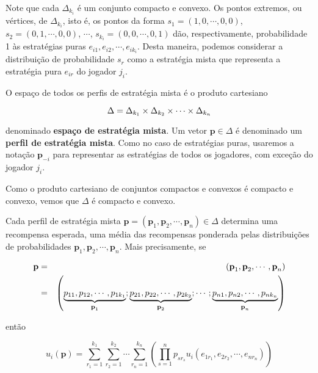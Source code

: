 Note que cada $\Delta_{k_i}$ é um conjunto compacto e convexo. Os pontos extremos, ou vértices, de $\Delta_{k_i}$, isto é, os pontos da forma $s_1=(1,0,\cdots,0,0)$, $s_2=(0,1,\cdots,0,0)$, $\cdots$, $s_{k_i}=(0,0,\cdots,0,1)$ dão, respectivamente, probabilidade 1 às estratégias puras $e_{i1}, e_{i2},\cdots , e_{ik_i}$. Desta maneira, podemos considerar a distribuição de probabilidade $s_r$ como a estratégia mista que representa a estratégia pura $e_{ir}$ do jogador $j_i$.

O espaço de todos os perfis de estratégia mista é o produto cartesiano

$$\Delta=\Delta_{k_1}\times\Delta_{k_2}\times\cdots\times\Delta_{k_n}$$

denominado \textbf{espaço de estratégia mista}. Um vetor $\textbf{p}\in\Delta$ é denominado um \textbf{perfil de estratégia mista}. Como no caso de estratégias puras, usaremos a notação $\textbf{p}_{-i}$ para representar as estratégias de todos os jogadores, com exceção do jogador $j_i$.

Como o produto cartesiano de conjuntos compactos e convexos é compacto e convexo, vemos que $\Delta$ é compacto e convexo.

Cada perfil de estratégia mista $\textbf{p}=(\textbf{p}_1,\textbf{p}_2,\cdots,\textbf{p}_n)\in\Delta$ determina uma recompensa esperada, uma média das recompensas ponderada pelas distribuições de probabilidades $\textbf{p}_1,\textbf{p}_2,\cdots,\textbf{p}_n$. Mais precisamente, se

\begin{eqnarray}
\textbf{p} & = & (\textbf{p}_1,\textbf{p}_2,\cdots,\textbf{p}_n)\nonumber\\\vspace{0.1cm}
 & = & \left(\underbrace{p_{11},p_{12},\cdots,p_{1k_1}}_{\textbf{p}_1};\underbrace{p_{21},p_{22},\cdots,p_{2k_2}}_{\textbf{p}_2};\cdots;\underbrace{p_{n1},p_{n2},\cdots,p_{nk_n}}_{\textbf{p}_n}\right)\nonumber
\end{eqnarray}\vspace{0.1cm}

então

\begin{equation}\nonumber
u_i(\textbf{p})=\sum_{r_1=1}^{k_1}\sum_{r_2=1}^{k_2}\cdots\sum_{r_n=1}^{k_n}\left(\prod_{s=1}^{n}{p_{sr_s}u_i\left(e_{1r_1},e_{2r_2},\cdots,e_{nr_n}\right)}\right)
\end{equation}\vspace{0.1cm}

